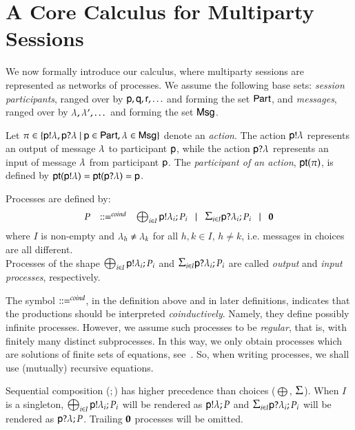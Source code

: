 
\section{A Core Calculus for Multiparty Sessions}

We now formally introduce our calculus, where multiparty sessions are
represented as networks of processes.  We assume the following base
sets: \emph{session participants}, ranged over by ${\sf p},{\sf q},{\sf r}, \ldots$
and forming the set ${\sf Part} $, and \emph{messages}, ranged over
by $\lambda,\lambda',\dots$ and forming the set ${\sf Msg}$.

Let $\pi \in \{ {\sf p}!\lambda, {\sf p}?\lambda ~|~
{\sf p}\in {\sf Part}, \lambda \in {\sf Msg}\}$ denote an \emph{action}.
The action ${\sf p}!\lambda$ represents an output of message $\lambda$ to
participant ${\sf p}$, while the action ${\sf p}?\lambda$ represents an
input of message $\lambda$ from participant ${\sf p}$.   The
\emph{participant of an action}, ${\sf pt}(\pi)$, is defined by
${\sf pt}({\sf p}!\lambda)={\sf pt}({\sf p}?\lambda)={\sf p}$.


\begin{definition}[Processes] 
 Processes are  defined by:\\
 \[
\begin{array}{lll}
\PP & \coDefGr  & 
\oup\pp{i}{I}{\la}{\PP}%
~~\mid~~  
\inp\pp{i}{I}{\la}{\PP}%
~~\mid~~
\inact
\end{array}
\]
\noindent
where $I$ is non-empty and $\lambda_h\not=\lambda_k$ for all $h,k\in I$,
$h\neq k$, i.e.
 messages  in choices are all different.\\
Processes of the shape $\bigoplus_{i\in I}{\sf p}!\lambda_i;P_i$ and
$\inp\pp{i}{I}{\la}{\PP}$ are called {\em output} and {\em input
  processes}, respectively.
\end{definition}\noindent
The symbol $ ::=^{coind}$, in the definition above and in later
definitions, indicates that the productions should be interpreted
\emph{coinductively}.  
Namely, they define possibly infinite processes.  However, we assume
such processes to be \emph{regular}, that is, with finitely many
distinct subprocesses. In this way, we only obtain processes which are
solutions of finite sets of equations, see~\cite{Cour83}. So, when
writing processes, we shall use (mutually) recursive equations.

Sequential composition ($;$) has higher precedence than choices ($\bigoplus$, $\SigmaB$). 
When $I$ is a singleton, $\bigoplus_{i\in I}{\sf p}!\lambda_i;P_i$ will be rendered as
${\sf p}!\lambda;P$ and $\inp\pp{i}{I}{\la}{\PP}$ will be
rendered as ${\sf p}?\lambda;P$.  Trailing $\mathbf{0}$ processes
will be omitted.

